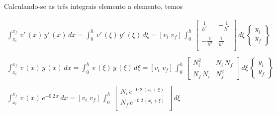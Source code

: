 Calculando-se as três integrais elemento a elemento, temos

\[
\begin{array}{l}
 \int_{x_i}^{x_f} \, v'\,(x) \, y'\,(x) \, dx = \int_0^h \, v'\,(\xi) \, y'\,(\xi) \, d\xi = [v_i \, \, v_f] \, \int_0^h 
 \,
 \left[
 \begin{array}{rr}
  \displaystyle \frac{1}{h^2} & - \displaystyle \frac{1}{h^2} \\
  \\
  - \displaystyle \frac{1}{h^2} & \displaystyle \frac{1}{h^2} \\
 \end{array}
 \right]
 \,
 d\xi
 \,
 \left\{
  \begin{array}{l}
   y_i \\
   y_f
  \end{array}
 \right\} \\
 \\
 \int_{x_i}^{x_f} \, v\,(x) \, y\,(x) \, dx = \int_0^h \, v\,(\xi) \, y\,(\xi) \, d\xi = [v_i \, \, v_f] \, \int_0^h 
 \,
 \left[
 \begin{array}{ll}
  N_i^2 & N_i\,N_f \\
  N_f\,N_i & N_f^2
 \end{array}
 \right]
 \,
 d\xi
 \,
 \left\{
  \begin{array}{l}
   y_i \\
   y_f
  \end{array}
 \right\} \\
 \\
 \int_{x_i}^{x_f} \, v\,(x) \, e^{-0.2\,x} \, dx = [v_i \, \, v_f] \, \int_0^h 
 \,
 \left[
 \begin{array}{l}
  N_i \, e^{-0.2\,(x_i + \xi)} \\
  N_f \, e^{-0.2\,(x_i + \xi)} \\
 \end{array}
 \right]
 \,
 d\xi
\end{array}
\]
